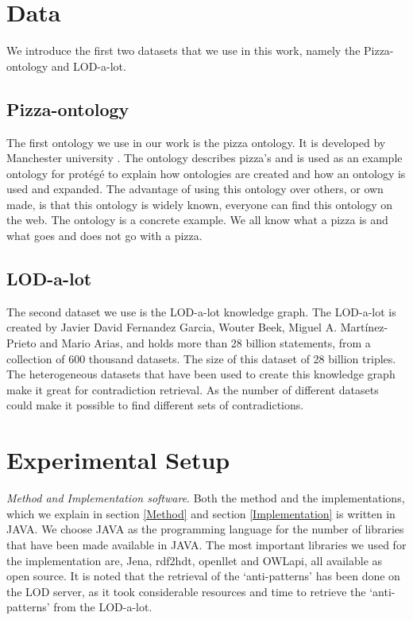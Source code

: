 \documentclass[11pt,letterpaper ,oneside ]{book}
\begin{document}
	\section{Data}
	We introduce the first two datasets that we use in this work, namely the Pizza-ontology and LOD-a-lot.
	
	\subsection{Pizza-ontology}
	The first ontology we use in our work is the pizza ontology. It is developed by Manchester university \cite{pizza}. The ontology describes pizza's and is used as an example ontology for prot\'{e}g\'{e} to explain how ontologies are created and how an ontology is used and expanded. The advantage of using this ontology over others, or own made, is that this ontology is widely known, everyone can find this ontology on the web. The ontology is a concrete example. We all know what a pizza is and what goes and does not go with a pizza. \\
	
	\subsection{LOD-a-lot}
	The second dataset we use is the LOD-a-lot\cite{JavierD:2017} knowledge graph. The LOD-a-lot is created by Javier David Fernandez Garcia, Wouter Beek, Miguel A. Martínez-Prieto and Mario Arias, and holds more than 28 billion statements, from a collection of 600 thousand datasets. The size of this dataset of 28 billion triples. The heterogeneous datasets that have been used to create this knowledge graph make it great for contradiction retrieval. As the number of different datasets could make it possible to find different sets of contradictions.
	
	\section{Experimental Setup}
	\textit{Method and Implementation software}. Both the method and the implementations, which we explain in section \ref{Method} and section \ref{Implementation} is written in JAVA. We choose JAVA as the programming language for the number of libraries that have been made available in JAVA. The most important libraries we used for the implementation are, Jena, rdf2hdt, openllet and OWLapi, all available as open source. It is noted that the retrieval of the `anti-patterns' has been done on the LOD server, as it took considerable resources and time to retrieve the `anti-patterns' from the LOD-a-lot. 
	
\end{document}
